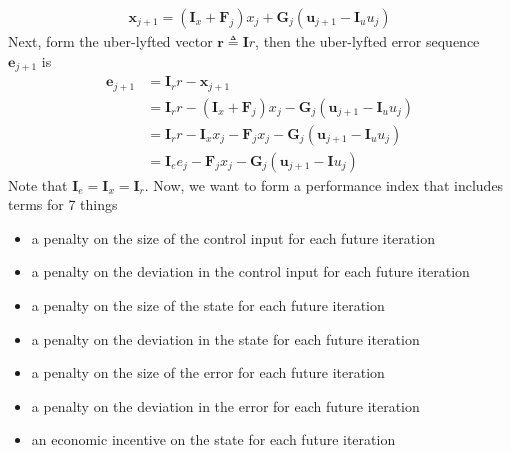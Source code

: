 \documentclass[landscape]{article}
\begin{document}
\begin{align}
\mathbf{x}_{j+1} = \left(\mathbf{I}_x +\mathbf{F}_j \right)x_j + \mathbf{G}_j \left(\mathbf{u}_{j+1} - \mathbf{I}_u u_j \right)
\end{align}
Next, form the uber-lyfted vector $\mathbf{r} \triangleq \mathbf{I} r$, then the uber-lyfted error sequence $\mathbf{e}_{j+1}$ is
\begin{align}
\mathbf{e}_{j+1} 
& = \mathbf{I}_r r - \mathbf{x}_{j+1}\\
& = \mathbf{I}_r r - \left(\mathbf{I}_x +\mathbf{F}_j \right)x_j - \mathbf{G}_j \left(\mathbf{u}_{j+1} - \mathbf{I}_u u_j \right)\\
& = \mathbf{I}_r r - \mathbf{I}_x x_j - \mathbf{F}_j x_j - \mathbf{G}_j \left(\mathbf{u}_{j+1} - \mathbf{I}_u u_j \right)\\
& = \mathbf{I}_e e_j - \mathbf{F}_j x_j - \mathbf{G}_j \left(\mathbf{u}_{j+1} - \mathbf{I}u_j \right)
\end{align}
Note that $\mathbf{I}_e=\mathbf{I}_x=\mathbf{I}_r$.
Now, we want to form a performance index that includes terms for 7 things 
\begin{itemize}
	\item a penalty on the size of the control input for each future iteration
	\item a penalty on the deviation in the control input for each future iteration
	\item a penalty on the size of the state for each future iteration
	\item a penalty on the deviation in the state for each future iteration
	\item a penalty on the size of the error for each future iteration
	\item a penalty on the deviation in the error for each future iteration
	\item an economic incentive on the state for each future iteration
\end{itemize}
\end{document}
